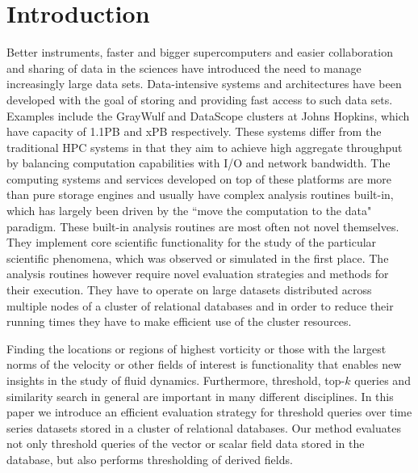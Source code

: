 \documentclass{sig-alternate}
\begin{document}
\section{Introduction}
Better instruments, faster and bigger supercomputers and easier collaboration and sharing of data in the sciences have introduced the need
to manage increasingly large data sets. Data-intensive systems and architectures have been developed with the goal of storing and providing
fast access to such data sets. Examples include the GrayWulf and DataScope clusters \cite{Szalay, TODO} at Johns Hopkins, which have capacity 
of 1.1PB and xPB
respectively. These systems differ from the traditional HPC systems in that they aim to achieve high aggregate throughput by balancing computation
capabilities with I/O and network bandwidth. The computing systems and services developed on top of these platforms are more than pure
storage engines and usually have complex analysis routines built-in, which has largely been driven by the ``move the computation to the data"
paradigm. These built-in analysis routines are most often not novel themselves. They implement core scientific functionality for the study of the
particular scientific phenomena, which was observed or simulated in the first place. The analysis routines however require novel evaluation strategies 
and methods for their execution. They have to operate on large datasets distributed across multiple nodes of a cluster of relational databases 
and in order to reduce their running times they have to make efficient use of the cluster resources. 

Finding the locations or regions of highest vorticity or those with the largest norms of the velocity or other fields of interest is
functionality that enables new insights in the study of fluid dynamics. Furthermore, threshold, top-$k$ queries and similarity search in general
are important in many different disciplines. In this paper we introduce an efficient evaluation strategy for threshold
queries over time series datasets stored in a cluster of relational databases. Our method evaluates not only threshold queries of the vector or 
scalar field data stored in the database, but also performs thresholding of derived fields.
\end{document}
